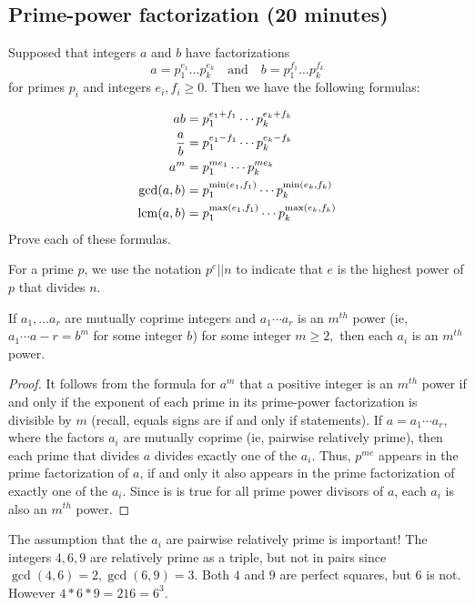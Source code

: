 \documentclass[letterpaper, 11 pt]{article}
\begin{document}
\subsection{Prime-power factorization (20 minutes)}

Supposed that integers $a$ and $b$ have factorizations
\[a=p_1^{e_1}\dots p_k^{e_k}\quad\textrm{and}\quad b=p_1^{f_1}\dots p_k^{f_k}\]
for primes $p_i$ and integers $e_i,f_i\geq0$. Then we have the following formulas:

\begin{br}[5 minutes]
\begin{align*}
ab&=p_1^{e_1+f_1}\cdots p_k^{e_k+f_k}\\
\frac{a}{b}&=p_1^{e_1-f_1}\cdots p_k^{e_k-f_k}\\ 
a^m&=p_1^{me_1}\cdots p_k^{me_k}\\
\gcd(a,b)&=p_1^{\min(e_1,f_1)}\cdots p_k^{\min(e_k,f_k)}\\
\operatorname{lcm}(a,b)&=p_1^{\max(e_1,f_1)}\cdots p_k^{\max(e_k,f_k)}
\end{align*}
 Prove each of these formulas.
\end{br}

For a prime $p$, we use the notation $p^e||n$ to indicate that $e$ is the highest power of $p$ that divides $n$.

\begin{lem}[Lemma 2.4]
If $a_1,\dots a_r$ are mutually coprime integers and $a_1\cdots a_r$ is an $m^{th}$ power (ie, $a_1\cdots a-r=b^m$ for some integer $b$) for some integer $m\geq 2,$ then each $a_i$ is an $m^{th}$ power.
\end{lem}
\begin{proof}
 It follows from the formula for $a^m$ that a positive integer is an $m^{th}$ power if and only if the exponent of each prime in its prime-power factorization is divisible by $m$ (recall, equals signs are if and only if statements). If $a=a_1\cdots a_r$, where the factors $a_i$ are mutually coprime (ie, pairwise relatively prime), then each prime that divides $a$ divides exactly one of the $a_i$. Thus, $p^{me}$ appears in the prime factorization of $a$, if and only it also appears in the prime factorization of exactly one of the $a_i$. Since is is true for all prime power divisors of $a$, each $a_i$ is also an $m^{th}$ power.
\end{proof}

The assumption that the $a_i$ are pairwise relatively prime is important! The integers $4, 6, 9$ are relatively prime as a triple, but not in pairs since $\gcd(4,6)=2, \gcd(6,9)=3$. Both $4$ and $9$ are perfect squares, but $6$ is not. However $4*6*9=216=6^3$.
\end{document}

